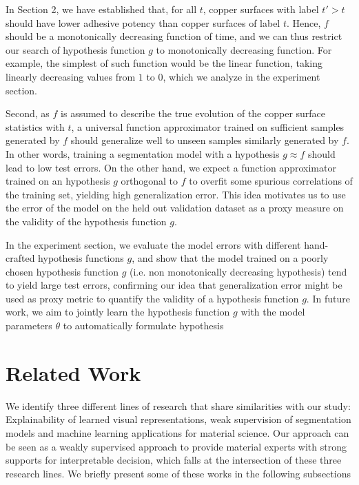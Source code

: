 \documentclass[10pt,twocolumn,letterpaper]{article}
\begin{document}
In Section 2, we have established that, for all $t$, 
copper surfaces with label $t' > t$ should have lower adhesive potency than copper surfaces of label $t$.
Hence, $f$ should be a monotonically decreasing function of time,
and we can thus restrict our search of hypothesis function $g$ to monotonically decreasing function.
For example, the simplest of such function would be the linear function, 
taking linearly decreasing values from $1$ to $0$,
which we analyze in the experiment section.

Second, as $f$ is assumed to describe the true evolution of the copper surface statistics with $t$,
a universal function approximator trained on sufficient samples generated by $f$ 
should generalize well to unseen samples similarly generated by $f$.
In other words, training a segmentation model with a hypothesis $g \approx f$ should lead to low test errors.
On the other hand, we expect a function approximator trained on an hypothesis $g$ orthogonal to $f$ to 
overfit some spurious correlations of the training set, yielding high generalization error. 
This idea motivates us to use the error of the model on the held out validation dataset as a proxy measure on
the validity of the hypothesis function $g$.

In the experiment section, we evaluate the model errors with different hand-crafted hypothesis functions $g$,
and show that the model trained on a poorly chosen hypothesis function $g$ (i.e. non monotonically decreasing hypothesis) 
tend to yield large test errors, confirming our idea that generalization error might be used as proxy metric
to quantify the validity of a hypothesis function $g$.
In future work, we aim to jointly learn the hypothesis function $g$ with the model parameters $\theta$ to automatically
formulate hypothesis

\section{Related Work}

We identify three different lines of research that share similarities with our study:
Explainability of learned visual representations, 
weak supervision of segmentation models and 
machine learning applications for material science.
Our approach can be seen as a weakly supervised approach to provide material 
experts with strong supports for interpretable decision, 
which falls at the intersection of these three research lines.
We briefly present some of these works in the following subsections
\end{document}
